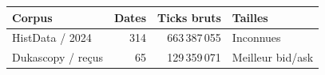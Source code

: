 \begin{tabular}{@{}lrrl@{}}
\toprule
Corpus & Dates & Ticks bruts & Tailles\\
\midrule
HistData / 2024 & 314 & 663\,387\,055 & Inconnues\\
Dukascopy / reçus & 65 & 129\,359\,071 & Meilleur bid/ask\\
\bottomrule
\end{tabular}
